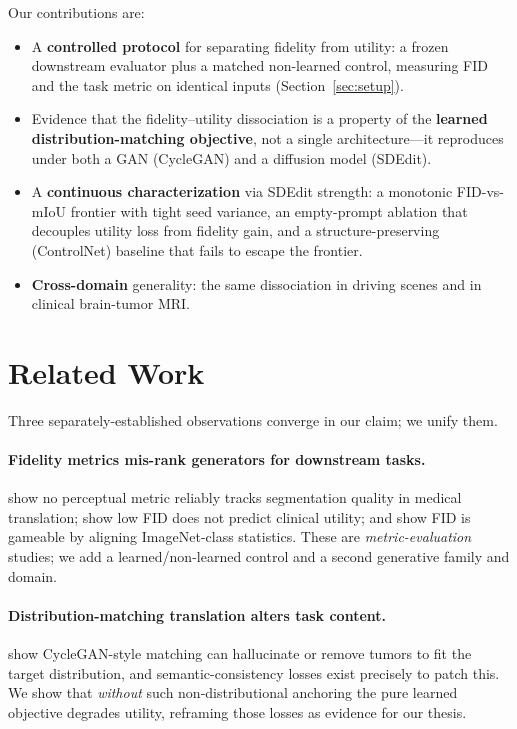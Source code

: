 \documentclass{article}
\begin{document}
Our contributions are:
\begin{itemize}
  \item A \textbf{controlled protocol} for separating fidelity from utility: a
  frozen downstream evaluator plus a matched non-learned control, measuring FID
  and the task metric on identical inputs (Section~\ref{sec:setup}).
  \item Evidence that the fidelity--utility dissociation is a property of the
  \textbf{learned distribution-matching objective}, not a single architecture---it
  reproduces under both a GAN (CycleGAN) and a diffusion model (SDEdit).
  \item A \textbf{continuous characterization} via SDEdit strength: a monotonic
  FID-vs-mIoU frontier with tight seed variance, an empty-prompt ablation that
  decouples utility loss from fidelity gain, and a structure-preserving
  (ControlNet) baseline that fails to escape the frontier.
  \item \textbf{Cross-domain} generality: the same dissociation in driving scenes
  and in clinical brain-tumor MRI.
\end{itemize}

\section{Related Work}
Three separately-established observations converge in our claim; we unify them.

\paragraph{Fidelity metrics mis-rank generators for downstream tasks.}
\citet{konz2024rethinking} show no perceptual metric reliably tracks segmentation
quality in medical translation; \citet{dutt2025chexgenbench} show low FID does not
predict clinical utility; and \citet{kynkaanniemi2023role} show FID is gameable by
aligning ImageNet-class statistics. These are \emph{metric-evaluation} studies; we
add a learned/non-learned control and a second generative family and domain.

\paragraph{Distribution-matching translation alters task content.}
\citet{cohen2018distribution} show CycleGAN-style matching can hallucinate or
remove tumors to fit the target distribution, and semantic-consistency losses
\citep{hoffman2018cycada,peng2023diffusion} exist precisely to patch this. We show
that \emph{without} such non-distributional anchoring the pure learned objective
degrades utility, reframing those losses as evidence for our thesis.
\end{document}
